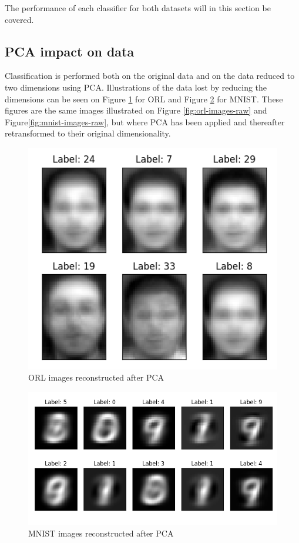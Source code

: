 The performance of each classifier for both datasets will in this section be covered. 

\subsection{PCA impact on data}
Classification is performed both on the original data and on the data reduced to two dimensions using PCA. Illustrations of the data lost by reducing the dimensions can be seen on Figure \ref{fig:orl-images-reconstructed} for ORL and Figure \ref{fig:mnist-images-reconstructed} for MNIST. These figures are the same images illustrated on Figure \ref{fig:orl-images-raw} and Figure\ref{fig:mnist-images-raw}, but where PCA has been applied and thereafter retransformed to their original dimensionality.  

\begin{figure}[htbp]
    \centering
    \includegraphics[width=0.7\columnwidth]{../source/orl/pictures/image-reconstructed-pca.png}
    \caption{ORL images reconstructed after PCA}
    \label{fig:orl-images-reconstructed}
\end{figure}

\begin{figure}[htbp]
    \centering
    \includegraphics[width=0.7\columnwidth]{../source/mnist/pictures/image-reconstructed-pca.png}
    \caption{MNIST images reconstructed after PCA}
    \label{fig:mnist-images-reconstructed}
\end{figure}

